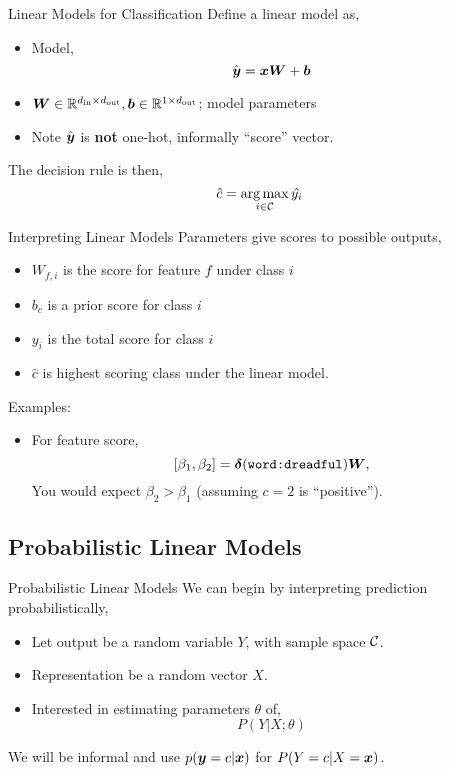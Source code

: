\documentclass{beamer}
\begin{document}
\begin{frame}{Linear Models for Classification}
  Define a linear model as,
  \begin{itemize}
  \item Model, \[\hat{\boldsymbol{y}} = \boldsymbol{x} \boldsymbol{W} + \boldsymbol{b}\]   
  \item $\boldsymbol{W} \in \mathbb{R}^{{d_{\mathrm{in}}} \times {d_{\mathrm{out}}}}, \boldsymbol{b} \in \mathbb{R}^{1 \times {d_{\mathrm{out}}}}$; model parameters
  \item Note $\hat{\boldsymbol{y}}$ is \textbf{not} one-hot, informally ``score'' vector. 
  \end{itemize}

  The decision rule is then,
  \[ \hat{c} = \argmax_{i \in \mcC} \hat{y_i} \]
\end{frame}


\begin{frame}{Interpreting Linear Models}
  Parameters give scores to possible outputs,
  \begin{itemize}
  \item $W_{f, i}$ is the score for feature $f$ under class $i$
  \item $b_c$ is a prior score for class $i$  
  \item $y_i$ is the total score for class $i$
  \item $\hat{c}$ is highest scoring class under the linear model.
  \end{itemize}

  Examples:
  \begin{itemize}
  \item For feature score, \[[\beta_1, \beta_2 ] = \boldsymbol{\delta}(\texttt{word:dreadful}) \boldsymbol{W},\]
    You would expect $\beta_2 > \beta_1$ (assuming $c=2$ is ``positive''). 
    
  \end{itemize}
\end{frame}

\subsection{Probabilistic Linear Models}

\begin{frame}{Probabilistic Linear Models} 
  We can begin by interpreting prediction probabilistically,

  \begin{itemize}
  \item Let output be a random variable $Y$, with sample space $\mathcal{C}$. 
  \item Representation be a random vector $X$. 
  \item Interested in estimating parameters $\theta$ of, 
    \[ P(Y | X; \theta) \] 
  \end{itemize}
  We will be informal and use $p(\boldsymbol{y}=c | \boldsymbol{x})$ for 
  $P(Y = c | X = \boldsymbol{x})$.
  
\end{frame}
\end{document}
